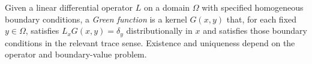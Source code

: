 
Given a linear differential operator $L$ on a domain $\Omega$ with specified homogeneous boundary conditions, a \emph{Green function} is a kernel $G(x,y)$ that, for each fixed $y\in\Omega$, satisfies $L_xG(x,y)=\delta_y$ distributionally in $x$ and satisfies those boundary conditions in the relevant trace sense. Existence and uniqueness depend on the operator and boundary-value problem.
